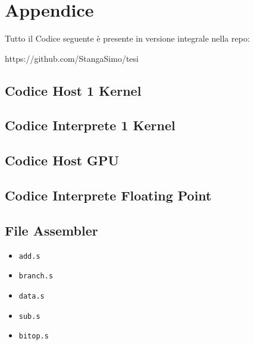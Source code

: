 \chapter{Appendice}
Tutto il Codice seguente è presente in versione integrale nella repo: 

\vspace{0.5cm}

\noindent https://github.com/StangaSimo/tesi

\section{Codice Host 1 Kernel}
\label{codicehost1cu}
 

\section{Codice Interprete 1 Kernel}
\label{codiceinterprete1cu}
 

% 

\section{Codice Host GPU}
\label{codicehost1cu}
 

\section{Codice Interprete Floating Point}
\label{codiceinterpretefloating}
 

\section{File Assembler}
\label{fileassembler}
\begin{itemize}
    \item \texttt{add.s}
     
    \item \texttt{branch.s}
     
    \item \texttt{data.s}
     
    \item \texttt{sub.s}
     
    \item \texttt{bitop.s}
     
\end{itemize}

% 



